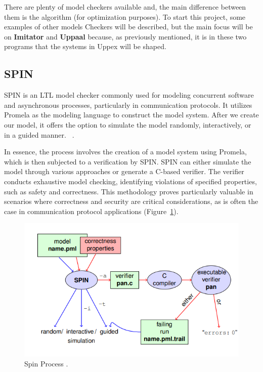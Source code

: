 
There are plenty of model checkers available and, the main difference between them is the algorithm (for optimization purposes). To start this project, some examples of other models Checkers will be described, but the main focus will be on \textbf{Imitator} and \textbf{Uppaal} because, as previously mentioned, it is in these two programs that the systems in Uppex will be shaped. 

\subsection*{SPIN}

 SPIN is an LTL model checker commonly used for modeling concurrent software and asynchronous processes, particularly in communication protocols. It utilizes Promela as the modeling language to construct the model system. After we create our model, it offers the option to simulate the model randomly, interactively, or in a guided manner. ~\cite{spin}.

In essence, the process involves the creation of a model system using Promela, which is then subjected to a verification by SPIN. SPIN can either simulate the model through various approaches or generate a C-based verifier. The verifier conducts exhaustive model checking, identifying violations of specified properties, such as safety and correctness. This methodology proves particularly valuable in scenarios where correctness and security are critical considerations, as is often the case in communication protocol applications (Figure~\ref{fig:Spin}).

\begin{figure} [H]
    \centering
    \includegraphics[width=0.75\linewidth]{chapters/spin.png}
    \caption[Spin Process]{Spin Process \cite{spin}.}
    \label{fig:Spin}
\end{figure}

